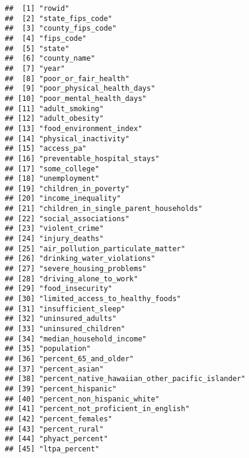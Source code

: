 \documentclass[
]{article}
\begin{document}
\begin{verbatim}
##  [1] "rowid"                                         
##  [2] "state_fips_code"                               
##  [3] "county_fips_code"                              
##  [4] "fips_code"                                     
##  [5] "state"                                         
##  [6] "county_name"                                   
##  [7] "year"                                          
##  [8] "poor_or_fair_health"                           
##  [9] "poor_physical_health_days"                     
## [10] "poor_mental_health_days"                       
## [11] "adult_smoking"                                 
## [12] "adult_obesity"                                 
## [13] "food_environment_index"                        
## [14] "physical_inactivity"                           
## [15] "access_pa"                                     
## [16] "preventable_hospital_stays"                    
## [17] "some_college"                                  
## [18] "unemployment"                                  
## [19] "children_in_poverty"                           
## [20] "income_inequality"                             
## [21] "children_in_single_parent_households"          
## [22] "social_associations"                           
## [23] "violent_crime"                                 
## [24] "injury_deaths"                                 
## [25] "air_pollution_particulate_matter"              
## [26] "drinking_water_violations"                     
## [27] "severe_housing_problems"                       
## [28] "driving_alone_to_work"                         
## [29] "food_insecurity"                               
## [30] "limited_access_to_healthy_foods"               
## [31] "insufficient_sleep"                            
## [32] "uninsured_adults"                              
## [33] "uninsured_children"                            
## [34] "median_household_income"                       
## [35] "population"                                    
## [36] "percent_65_and_older"                          
## [37] "percent_asian"                                 
## [38] "percent_native_hawaiian_other_pacific_islander"
## [39] "percent_hispanic"                              
## [40] "percent_non_hispanic_white"                    
## [41] "percent_not_proficient_in_english"             
## [42] "percent_females"                               
## [43] "percent_rural"                                 
## [44] "phyact_percent"                                
## [45] "ltpa_percent"
\end{verbatim}
\end{document}
